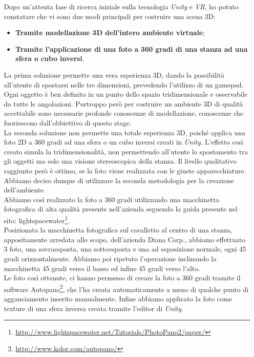 Dopo un'attenta fase di ricerca iniziale sulla tecnologia \textit{Unity} e \textit{VR}, ho potuto constatare che vi sono due modi principali per costruire una scena 3D:

\begin{itemize}
	\item \textbf{Tramite modellazione 3D dell'intero ambiente virtuale};
	\item \textbf{Tramite l'applicazione di una foto a 360 gradi di una stanza ad una sfera o cubo inversi}.
\end{itemize}

La prima soluzione permette una vera esperienza 3D, dando la possibilità all'utente di spostarsi nelle tre dimensioni, prevedendo l'utilizzo di un gamepad. Ogni oggetto è ben definito in un punto dello spazio tridimensionale e osservabile da tutte le angolazioni. Purtroppo però per costruire un ambiente 3D di qualità accettabile sono necessarie profonde conoscenze di modellazione, conoscenze che fuoriescono dall'obbiettivo di questo stage. \\
La seconda soluzione non permette una totale esperienza 3D, poiché applica una foto 2D a 360 gradi ad una sfera o un cubo inversi creati in \textit{Unity}. L'effetto così creato simula la tridimensionalità, non permettendo all'utente lo spostamento tra gli oggetti ma solo una visione stereoscopica della stanza. Il livello qualitativo raggiunto però è ottimo, se la foto viene realizzata con le giuste apparecchiature. Abbiamo deciso dunque di utilizzare la seconda metodologia per la creazione dell'ambiente. \\
Abbiamo così realizzato la foto a 360 gradi utilizzando una macchinetta fotografica di alta qualità presente nell'azienda seguendo la guida presente nel sito: lightspacewater\footnote[2]{\url{http://www.lightspacewater.net/Tutorials/PhotoPano2/paper/}}. \\
Posizionata la macchinetta fotografica sul cavalletto al centro di una stanza, appositamente arredata allo scopo, dell'azienda Diana Corp., abbiamo effettuato 3 foto, una sovraesposta, una sottoesposta e una ad esposizione normale, ogni 45 gradi orizzontalmente. Abbiamo poi ripetuto l'operazione inclinando la macchinetta 45 gradi verso il basso ed infine 45 gradi verso l'alto. \\ 
Le foto così ottenute, ci hanno permesso di creare la foto a 360 gradi tramite il software Autopano\footnote[3]{\url{http://www.kolor.com/autopano/}}, che l'ha creata automaticamente a meno di qualche punto di agganciamento inserito manualmente. Infine abbiamo applicato la foto come texture di una sfera inversa creata tramite l'editor di \textit{Unity}.


